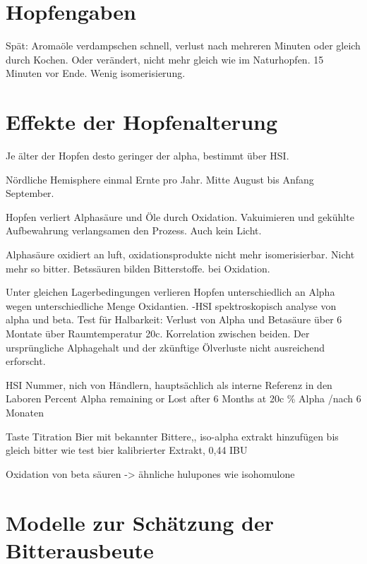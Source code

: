 \documentclass[a4paper,parskip=half]{scrartcl}
\begin{document}
\section*{Hopfengaben}

\parencite[15]{Garetz1994}
Spät: Aromaöle verdampschen schnell, verlust nach mehreren Minuten
oder gleich durch Kochen. Oder verändert, nicht mehr gleich
wie im Naturhopfen. 15 Minuten vor Ende. Wenig isomerisierung.

\section*{Effekte der Hopfenalterung}

\parencite[50]{Holle2010}
Je älter der Hopfen desto geringer der alpha, bestimmt über
HSI.

Nördliche Hemisphere einmal Ernte pro Jahr. Mitte August bis
Anfang September.
\parencite[97]{Garetz1994}

\parencite[97]{Garetz1994} Hopfen verliert Alphasäure und Öle
durch Oxidation. Vakuimieren und gekühlte Aufbewahrung verlangsamen
den Prozess. Auch kein Licht. 

\parencite[103]{Garetz1994} Alphasäure oxidiert an luft, oxidationsprodukte
nicht mehr isomerisierbar. Nicht mehr so bitter. Betssäuren bilden
Bitterstoffe. bei Oxidation.

\parencite[104]{Garetz1994} 
Unter gleichen Lagerbedingungen verlieren Hopfen unterschiedlich an
Alpha wegen unterschiedliche Menge Oxidantien.
-HSI spektroskopisch analyse von alpha und beta. Test für Halbarkeit:
Verlust von Alpha und Betasäure über 6 Montate über Raumtemperatur 20c.
Korrelation zwischen beiden. Der ursprüngliche Alphagehalt und der
zkünftige
Ölverluste nicht ausreichend erforscht.

\parencite[104]{Garetz1994} 
HSI Nummer, nich von Händlern, hauptsächlich als interne Referenz
in den Laboren
Percent Alpha remaining or Lost after 6 Months at 20c
\% Alpha /nach 6 Monaten

\parencite[145-151]{Garetz1994}
Taste Titration 
Bier mit bekannter Bittere,, iso-alpha extrakt hinzufügen
bis gleich bitter wie test bier kalibrierter Extrakt, 0,44 IBU

\parencite[52]{Davidson1997}
Oxidation von beta säuren -> ähnliche hulupones wie isohomulone



\section*{Modelle zur Schätzung der Bitterausbeute}
\end{document}
